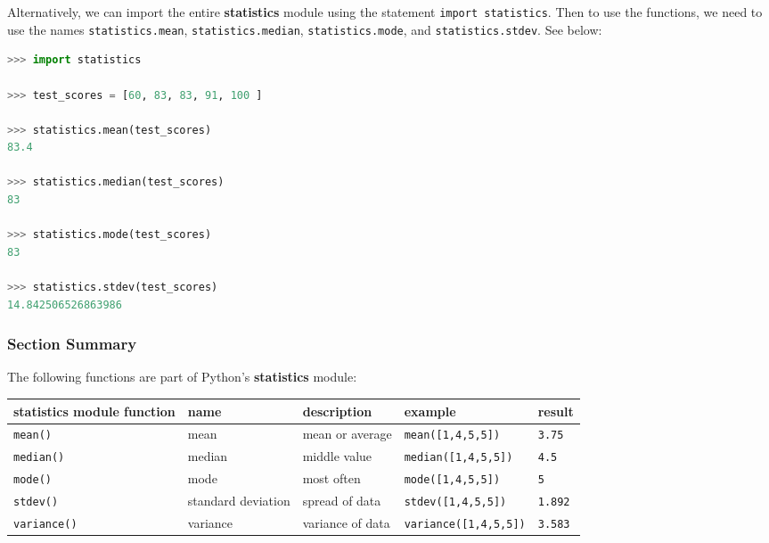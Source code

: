 \documentclass{book}
\newcommand{\passthrough}[1]{#1}
\begin{document}
Alternatively, we can import the entire \textbf{statistics} module using
the statement \passthrough{\lstinline!import statistics!}. Then to use
the functions, we need to use the names
\passthrough{\lstinline!statistics.mean!},
\passthrough{\lstinline!statistics.median!},
\passthrough{\lstinline!statistics.mode!}, and
\passthrough{\lstinline!statistics.stdev!}. See below:

\begin{lstlisting}[language=Python]
>>> import statistics
    
>>> test_scores = [60, 83, 83, 91, 100 ]
    
>>> statistics.mean(test_scores)
83.4

>>> statistics.median(test_scores)
83

>>> statistics.mode(test_scores)
83
    
>>> statistics.stdev(test_scores)
14.842506526863986 
\end{lstlisting}
    




    
        \hypertarget{section-summary}{%
\subsubsection{Section Summary}\label{section-summary}}

The following functions are part of Python's \textbf{statistics} module:

\begin{longtable}[]{@{}lllll@{}}
\toprule
statistics module function & name & description & example &
result\tabularnewline
\midrule
\endhead
\passthrough{\lstinline!mean()!} & mean & mean or average &
\passthrough{\lstinline!mean([1,4,5,5])!} &
\passthrough{\lstinline!3.75!}\tabularnewline
\passthrough{\lstinline!median()!} & median & middle value &
\passthrough{\lstinline!median([1,4,5,5])!} &
\passthrough{\lstinline!4.5!}\tabularnewline
\passthrough{\lstinline!mode()!} & mode & most often &
\passthrough{\lstinline!mode([1,4,5,5])!} &
\passthrough{\lstinline!5!}\tabularnewline
\passthrough{\lstinline!stdev()!} & standard deviation & spread of data
& \passthrough{\lstinline!stdev([1,4,5,5])!} &
\passthrough{\lstinline!1.892!}\tabularnewline
\passthrough{\lstinline!variance()!} & variance & variance of data &
\passthrough{\lstinline!variance([1,4,5,5])!} &
\passthrough{\lstinline!3.583!}\tabularnewline
\bottomrule
\end{longtable}
    
\end{document}
